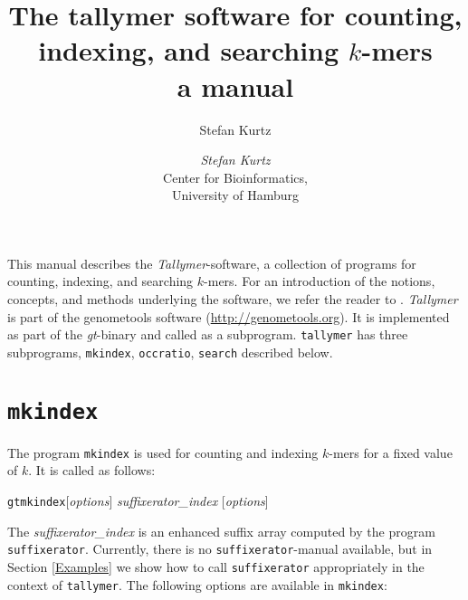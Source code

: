 \documentclass[12pt]{article}
\title{The tallymer software for counting, indexing, and searching $k$-mers\\
a manual}
\author{Stefan Kurtz}
\author{\begin{tabular}{c}
         \emph{Stefan Kurtz}\\
         Center for Bioinformatics,\\
         University of Hamburg
        \end{tabular}}
\newcommand{\Programname}[1]{\texttt{\small #1}}
\newcommand{\Tallymer}[0]{\Programname{tallymer}\xspace}
\newcommand{\TYmkindex}[0]{\Programname{mkindex}\xspace}
\newcommand{\TYsearch}[0]{\Programname{search}\xspace}
\newcommand{\TYoccratio}[0]{\Programname{occratio}\xspace}
\newcommand{\SFX}[0]{\Programname{suffixerator}\xspace}
\newcommand{\GT}[0]{\Programname{gt}\xspace}
\begin{document}
\maketitle
This manual describes the \textit{Tallymer}-software, a collection of programs
for counting, indexing, and searching $k$-mers. For an introduction of
the notions, concepts, and methods underlying the software, we refer
the reader to \cite{KUR:NER:STE:WAR:2008}. \textit{Tallymer} is part of
the genometools software (\url{http://genometools.org}). It is implemented
as part of the \textit{gt}-binary and called as a subprogram. \Tallymer
has three subprograms, \TYmkindex, \TYoccratio, \TYsearch described below.

\section{\TYmkindex}
The program \TYmkindex is used for counting and indexing \(k\)-mers for
a fixed value of \(k\). It is called as follows:
\par
\noindent\GT \TYmkindex [\emph{options}]  
\emph{suffixerator\_index} [\emph{options}]
\par
The \emph{suffixerator\_index} is an enhanced suffix array computed by the
program \SFX. Currently, there is no \SFX-manual available, but in Section
\ref{Examples} we show how to call \SFX appropriately in  the context of
\Tallymer. The following options are available in \TYmkindex:
\end{document}
